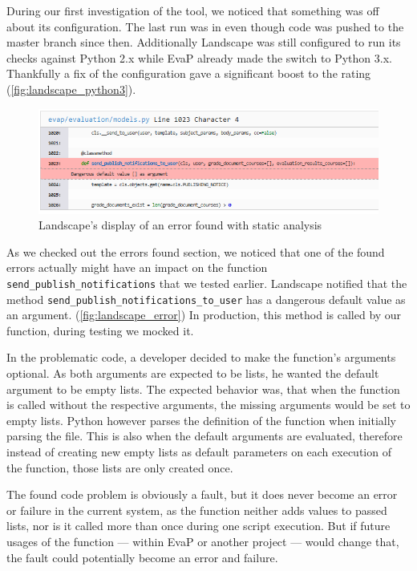 During our first investigation of the tool, we noticed that something was off about its configuration.
The last run was in %
even though code was pushed to the master branch since then.
Additionally Landscape was still configured to run its checks against Python 2.x while EvaP already made the switch to Python 3.x.
Thankfully a fix of the configuration gave a significant boost to the rating (\autoref{fig:landscape_python3}).

\begin{figure}[h]
    \centering
    \includegraphics[width=\textwidth, keepaspectratio]{graphics/landscape_error}
    \caption{Landscape's display of an error found with static analysis}
    \label{fig:landscape_error}
\end{figure} 

As we checked out the errors found section, we noticed that one of the found errors actually might have an impact on the function \texttt{send\_publish\_notifications} that we tested earlier. 
Landscape notified that the method \texttt{send\_publish\_notifications\_to\_user} has a dangerous default value as an argument.
(\autoref{fig:landscape_error})
In production, this method is called by our function, during testing we mocked it.

In the problematic code, a developer decided to make the function's arguments optional.
As both arguments are expected to be lists, he wanted the default argument to be empty lists.
The expected behavior was, that when the function is called without the respective arguments, the missing arguments would be set to empty lists.
Python however parses the definition of the function when initially parsing the file.
This is also when the default arguments are evaluated, therefore instead of creating new empty lists as default parameters on each execution of the function, those lists are only created once.

The found code problem is obviously a fault, but it does never become an error or failure in the current system, as the function neither adds values to passed lists, nor is it called more than once during one script execution.
But if future usages of the function --- within EvaP or another project --- would change that, the fault could potentially become an error and failure.


